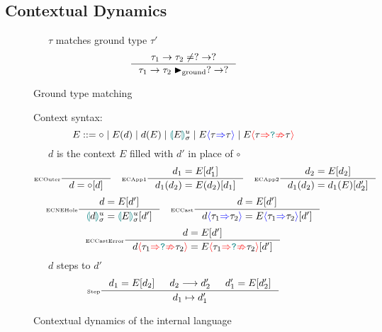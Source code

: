 \subsection{Contextual Dynamics}
\begin{figure}[H]
\small
{}\ \ \ $\tau$ matches ground type $\tau'$
\tiny
\[\inference[\tiny]{\tau_1 \to \tau_2 \neq ? \to ?}{\tau_1 \to \tau_2 \groundmatch ? \to ?}\]
\caption{Ground type matching}
\label{fig:groundmatch}
\end{figure}

\begin{figure}[H]
Context syntax:
\[E ::= \circ \mid E(d) \mid d(E) \mid \hole[E]^u_\sigma \mid E\scast{\tau}{\tau} \mid E\scasterror{\tau}{\tau}\]
\small
{}\ \ \ $d$ is the context $E$ filled with $d'$ in place of $\circ$
\tiny
\[\inference[\tiny ECOuter]{}{d = \circ[d]} \quad
\inference[\tiny ECApp1]{d_1 = E[d_1']}{d_1(d_2) = E(d_2)[d_1]}\quad
\inference[\tiny ECApp2]{d_2 = E[d_2]}{d_1(d_2) = d_1(E)[d_2']}\]
\[\inference[\tiny ECNEHole]{d=E[d']}{\hole[d]^u_\sigma = \hole[E]^u_\sigma [d']}\quad
\inference[\tiny ECCast]{d=E[d']}{d\scast{\tau_1}{\tau_2} = E\scast{\tau_1}{\tau_2}[d']}\]
\[\inference[\tiny ECCastError]{d=E[d']}{d\scasterror{\tau_1}{\tau_2} = E\scasterror{\tau_1}{\tau_2}[d']}\]
\small
{}\ \ \ $d$ steps to $d'$
\tiny
\[\inference[\tiny Step]{d_1=E[d_2] & d_2 \longrightarrow d_2' & d_1' = E[d_2']}{d_1 \mapsto d_1'}\]
\caption{Contextual dynamics of the internal language}
\label{fig:dynamics}
\end{figure}

